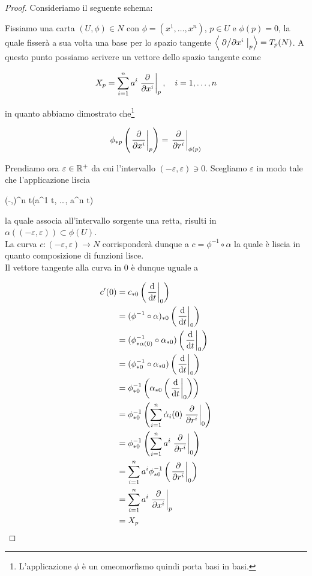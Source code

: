\begin{proof}
	Consideriamo il seguente schema:
	

	Fissiamo una carta $ (U,\phi) \in N $ con $ \phi = (x^{1},\dots,x^{n}) $, $ p \in U $ e $ \phi(p) = 0 $, la quale fisserà a sua volta una base per lo spazio tangente $ \ev{ \eval{ \pdv*{x^{i}} }_{p} } = T_{p}(N) $. A questo punto possiamo scrivere un vettore dello spazio tangente come
	
	\begin{equation}
		X_{p} = \sum_{i=1}^{n} a^{i} \eval{ \pdv{x^{i}} }_{p} \qcomma i=1,\dots,n
	\end{equation}

	in quanto abbiamo dimostrato che\footnote{%
		L'applicazione $ \phi $ è un omeomorfismo quindi porta basi in basi.%
	}
	
	\begin{equation}
		\phi_{*p} \left( \eval{ \pdv{x^{i}} }_{p} \right) = \eval{ \pdv{r^{i}} }_{\phi(p)}
	\end{equation}
	
	Prendiamo ora $ \varepsilon \in \mathbb{R}^{+} $ da cui l'intervallo $ (-\varepsilon,\varepsilon) \ni 0 $. Scegliamo $ \varepsilon $ in modo tale che l'applicazione liscia
	
	\map{\alpha}
		{(-\varepsilon,\varepsilon)}{\R^{n}}
		{t}{(a^{1} t, \dots, a^{n} t)}

	la quale associa all'intervallo sorgente una retta, risulti in $ \alpha((-\varepsilon,\varepsilon)) \subset \phi(U) $.\\
	La curva $ c : (-\varepsilon,\varepsilon) \to N $ corrisponderà dunque a $ c = \phi^{-1} \circ \alpha $ la quale è liscia in quanto composizione di funzioni lisce.\\
	Il vettore tangente alla curva in 0 è dunque uguale a
	
	\begin{align}
		\begin{split}
			c'(0) &= c_{*0} \left( \eval{ \dv{t} }_{0} \right)\\
			&= (\phi^{-1} \circ \alpha)_{*0} \left( \eval{ \dv{t} }_{0} \right)\\
			&= (\phi^{-1}_{*\alpha(0)} \circ \alpha_{*0}) \left( \eval{ \dv{t} }_{0} \right)\\
			&= (\phi^{-1}_{*0} \circ \alpha_{*0}) \left( \eval{ \dv{t} }_{0} \right)\\
			&= \phi^{-1}_{*0} \left( \alpha_{*0} \left( \eval{ \dv{t} }_{0} \right) \right)\\
			&= \phi^{-1}_{*0} \left( \sum_{i=1}^{n} \dot{\alpha}_{i}(0) \eval{ \pdv{r^{i}} }_{0} \right)\\
			&= \phi^{-1}_{*0} \left( \sum_{i=1}^{n} a^{i} \eval{ \pdv{r^{i}} }_{0} \right)\\
			&= \sum_{i=1}^{n} a^{i} \phi^{-1}_{*0} \left( \eval{ \pdv{r^{i}} }_{0} \right)\\
			&= \sum_{i=1}^{n} a^{i} \eval{ \pdv{x^{i}} }_{p}\\
			&= X_{p}
		\end{split}
	\end{align}


\end{proof}
